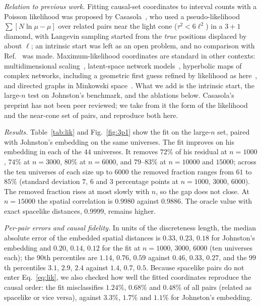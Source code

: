 \documentclass[prd,twocolumn,superscriptaddress,nofootinbib,amsmath,amssymb,floatfix]{revtex4-2}
\begin{document}
\emph{Relation to previous work.} Fitting causal-set coordinates to interval counts with a Poisson likelihood was proposed by Casasola~\cite{Casasola26}, who used a pseudo-likelihood $\sum[N\ln\mu-\mu]$ over related pairs near the light cone ($\tau^2<6\ell^2$) in a $3+1$ diamond, with Langevin sampling started from the \emph{true} positions displaced by about $\ell$; an intrinsic start was left as an open problem, and no comparison with Ref.~\cite{Johnston25} was made. Maximum-likelihood coordinates are standard in other contexts: multidimensional scaling~\cite{Ramsay77}, latent-space network models~\cite{Hoff02}, hyperbolic maps of complex networks, including a geometric first guess refined by likelihood as here~\cite{BPK10,Mercator19}, and directed graphs in Minkowski space~\cite{Sim21}. What we add is the intrinsic start, the large-$n$ test on Johnston's benchmark, and the ablations below. Casasola's preprint has not been peer reviewed; we take from it the form of the likelihood and the near-cone set of pairs, and reproduce both here.

\emph{Results.} Table~\ref{tab:lik} and Fig.~\ref{fig:3p1} show the fit on the large-$n$ set, paired with Johnston's embedding on the same universes. The fit improves on his embedding in each of the $44$ universes. It removes $72\%$ of his residual at $n=1000$, $74\%$ at $n=3000$, $80\%$ at $n=6000$, and $79$--$83\%$ at $n=10000$ and $15000$; across the ten universes of each size up to $6000$ the removed fraction ranges from $61$ to $85\%$ (standard deviation $7$, $6$ and $3$ percentage points at $n=1000$, $3000$, $6000$). The removed fraction rises at most slowly with $n$, so the gap does not close. At $n=15000$ the spatial correlation is $0.9980$ against $0.9886$. The oracle value with exact spacelike distances, $0.9999$, remains higher.

\emph{Per-pair errors and causal fidelity.} In units of the discreteness length, the median absolute error of the embedded spatial distances is $0.33$, $0.23$, $0.18$ for Johnston's embedding and $0.20$, $0.14$, $0.12$ for the fit at $n=1000$, $3000$, $6000$ (ten universes each); the $90$th percentiles are $1.14$, $0.76$, $0.59$ against $0.46$, $0.33$, $0.27$, and the $99$th percentiles $3.1$, $2.9$, $2.4$ against $1.4$, $0.7$, $0.5$. Because spacelike pairs do not enter Eq.~\eqref{eq:lik}, we also checked how well the fitted coordinates reproduce the causal order: the fit misclassifies $1.24\%$, $0.68\%$ and $0.48\%$ of all pairs (related as spacelike or vice versa), against $3.3\%$, $1.7\%$ and $1.1\%$ for Johnston's embedding.
\end{document}
